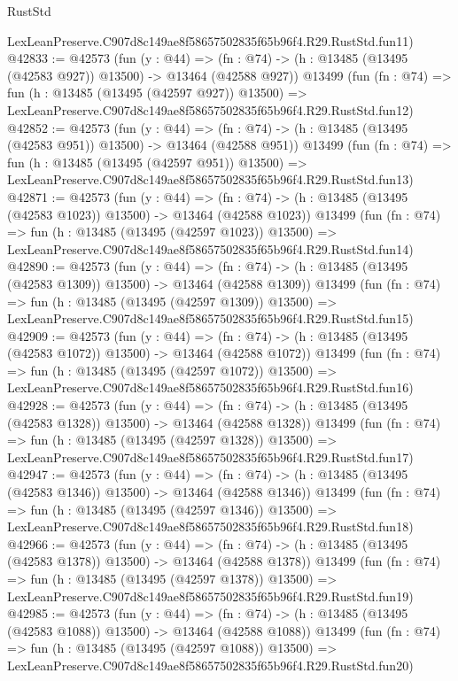 \begin{lexlean}{RustStd}
\begin{coremodule}
    LexLeanPreserve.C907d8c149ae8f58657502835f65b96f4.R29.RustStd.fun11)
@42833 := @42573
    (fun (y : @44) =>
    (fn : @74) -> (h : @13485 (@13495 (@42583 @927)) @13500) -> @13464 (@42588 @927))
    @13499
    (fun (fn : @74) =>
    fun (h : @13485 (@13495 (@42597 @927)) @13500) =>
    LexLeanPreserve.C907d8c149ae8f58657502835f65b96f4.R29.RustStd.fun12)
@42852 := @42573
    (fun (y : @44) =>
    (fn : @74) -> (h : @13485 (@13495 (@42583 @951)) @13500) -> @13464 (@42588 @951))
    @13499
    (fun (fn : @74) =>
    fun (h : @13485 (@13495 (@42597 @951)) @13500) =>
    LexLeanPreserve.C907d8c149ae8f58657502835f65b96f4.R29.RustStd.fun13)
@42871 := @42573
    (fun (y : @44) =>
    (fn : @74) -> (h : @13485 (@13495 (@42583 @1023)) @13500) -> @13464 (@42588 @1023))
    @13499
    (fun (fn : @74) =>
    fun (h : @13485 (@13495 (@42597 @1023)) @13500) =>
    LexLeanPreserve.C907d8c149ae8f58657502835f65b96f4.R29.RustStd.fun14)
@42890 := @42573
    (fun (y : @44) =>
    (fn : @74) -> (h : @13485 (@13495 (@42583 @1309)) @13500) -> @13464 (@42588 @1309))
    @13499
    (fun (fn : @74) =>
    fun (h : @13485 (@13495 (@42597 @1309)) @13500) =>
    LexLeanPreserve.C907d8c149ae8f58657502835f65b96f4.R29.RustStd.fun15)
@42909 := @42573
    (fun (y : @44) =>
    (fn : @74) -> (h : @13485 (@13495 (@42583 @1072)) @13500) -> @13464 (@42588 @1072))
    @13499
    (fun (fn : @74) =>
    fun (h : @13485 (@13495 (@42597 @1072)) @13500) =>
    LexLeanPreserve.C907d8c149ae8f58657502835f65b96f4.R29.RustStd.fun16)
@42928 := @42573
    (fun (y : @44) =>
    (fn : @74) -> (h : @13485 (@13495 (@42583 @1328)) @13500) -> @13464 (@42588 @1328))
    @13499
    (fun (fn : @74) =>
    fun (h : @13485 (@13495 (@42597 @1328)) @13500) =>
    LexLeanPreserve.C907d8c149ae8f58657502835f65b96f4.R29.RustStd.fun17)
@42947 := @42573
    (fun (y : @44) =>
    (fn : @74) -> (h : @13485 (@13495 (@42583 @1346)) @13500) -> @13464 (@42588 @1346))
    @13499
    (fun (fn : @74) =>
    fun (h : @13485 (@13495 (@42597 @1346)) @13500) =>
    LexLeanPreserve.C907d8c149ae8f58657502835f65b96f4.R29.RustStd.fun18)
@42966 := @42573
    (fun (y : @44) =>
    (fn : @74) -> (h : @13485 (@13495 (@42583 @1378)) @13500) -> @13464 (@42588 @1378))
    @13499
    (fun (fn : @74) =>
    fun (h : @13485 (@13495 (@42597 @1378)) @13500) =>
    LexLeanPreserve.C907d8c149ae8f58657502835f65b96f4.R29.RustStd.fun19)
@42985 := @42573
    (fun (y : @44) =>
    (fn : @74) -> (h : @13485 (@13495 (@42583 @1088)) @13500) -> @13464 (@42588 @1088))
    @13499
    (fun (fn : @74) =>
    fun (h : @13485 (@13495 (@42597 @1088)) @13500) =>
    LexLeanPreserve.C907d8c149ae8f58657502835f65b96f4.R29.RustStd.fun20)

\end{coremodule}
\end{lexlean}

